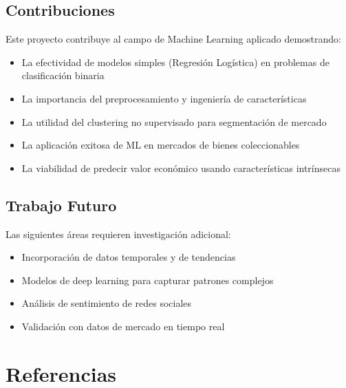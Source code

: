 \documentclass[12pt,letterpaper]{article}
\begin{document}
\subsection{Contribuciones}

Este proyecto contribuye al campo de Machine Learning aplicado demostrando:
\begin{itemize}
    \item La efectividad de modelos simples (Regresión Logística) en problemas de clasificación binaria
    \item La importancia del preprocesamiento y ingeniería de características
    \item La utilidad del clustering no supervisado para segmentación de mercado
    \item La aplicación exitosa de ML en mercados de bienes coleccionables
    \item La viabilidad de predecir valor económico usando características intrínsecas
\end{itemize}

\subsection{Trabajo Futuro}

Las siguientes áreas requieren investigación adicional:
\begin{itemize}
    \item Incorporación de datos temporales y de tendencias
    \item Modelos de deep learning para capturar patrones complejos
    \item Análisis de sentimiento de redes sociales
    \item Validación con datos de mercado en tiempo real
\end{itemize}

\section{Referencias}
\end{document}
